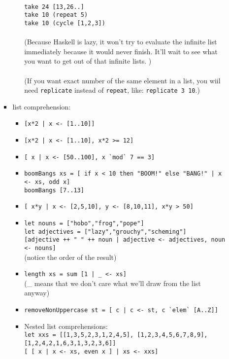 \documentclass[a4paper,10pt]{article}
\begin{document}
\begin{enumerate}
\begin{enumerate}
\begin{itemize}
\begin{itemize}
   \\\texttt{take 24 [13,26..]}
   \\\texttt{take 10 (repeat 5)}
   \\\texttt{take 10 (cycle [1,2,3])}
   \\\\(Because Haskell is lazy, it won't try to evaluate the infinite list immediately because it would never finish. It'll wait to see what you want to get out of that infinite lists. )
   \\\\(If you want exact number of the same element in a list, you wiil need \texttt{replicate} instead of \texttt{repeat}, like: \texttt{replicate 3 10}.)\\
  \end{itemize}
  \item list comprehension:
  \begin{itemize}
   \item \texttt{[x*2 | x <- [1..10]]}
   \item \texttt{[x*2 | x <- [1..10], x*2 >= 12]}
   \item \texttt{[ x | x <- [50..100], x \`{}mod\`{} 7 == 3]}
   \item \texttt{boomBangs xs = [ if x < 10 then "BOOM!" else "BANG!" | x <- xs, odd x]}
   \\\texttt{boomBangs [7..13]}
   \item \texttt{[ x*y | x <- [2,5,10], y <- [8,10,11], x*y > 50]}
   \item \texttt{let nouns = ["hobo","frog","pope"]}
   \\\texttt{let adjectives = ["lazy","grouchy","scheming"]}
   \\\texttt{[adjective ++ " " ++ noun | adjective <- adjectives, noun <- nouns]}
   \\(notice the order of the result)
   \item \texttt{length\textquotesingle \ xs = sum [1 | \_ <- xs]}
   \\(\_ means that we don't care what we'll draw from the list anyway)
   \item \texttt{removeNonUppercase st = [ c | c <- st, c \`{}elem\`{} [\textquotesingle A\textquotesingle..\textquotesingle Z\textquotesingle]]}
   \item Nested list comprehensions:
   \\\texttt{let xxs = [[1,3,5,2,3,1,2,4,5], [1,2,3,4,5,6,7,8,9], [1,2,4,2,1,6,3,1,3,2,3,6]]}
   \\\texttt{[ [ x | x <- xs, even x ] | xs <- xxs]}

\end{itemize}
\end{itemize}
\end{enumerate}
\end{enumerate}
\end{document}
